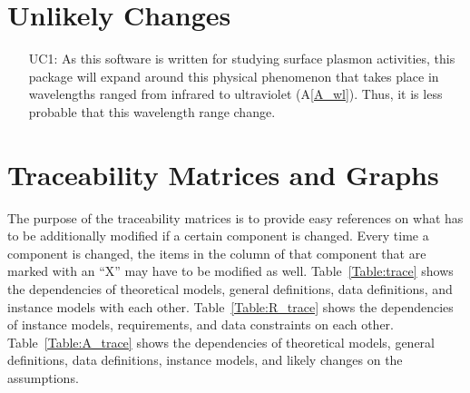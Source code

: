 \documentclass[12pt]{article}
\begin{document}
	\section{Unlikely Changes}
	
	\noindent \begin{itemize}
		
		\item[UC1\label{LC_wavelength}:] As this software is written for studying
		surface plasmon activities, this package will expand around this physical
		phenomenon that takes place in wavelengths ranged from infrared to ultraviolet
		(A\ref{A_wl}). Thus, it is less probable that this wavelength range change.
		
		
	\end{itemize}
	
	\section{Traceability Matrices and Graphs}
	
	The purpose of the traceability matrices is to provide easy references on what
	has to be additionally modified if a certain component is changed.  Every time
	a component is changed, the items in the column of that component that are
	marked with an ``X'' may have to be modified as well.  Table~\ref{Table:trace}
	shows the dependencies of theoretical models, general definitions, data
	definitions, and instance models with each other. Table~\ref{Table:R_trace}
	shows the dependencies of instance models, requirements, and data constraints
	on each other. Table~\ref{Table:A_trace} shows the dependencies of theoretical
	models, general definitions, data definitions, instance models, and likely
	changes on the assumptions.
	
	
	
\end{document}
